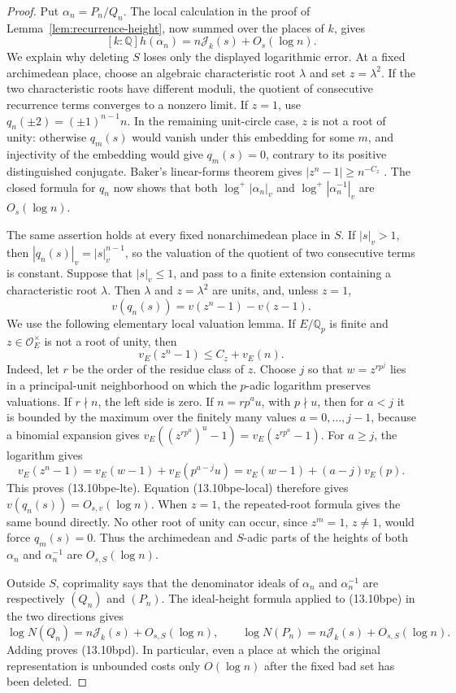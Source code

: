 \documentclass[11pt,reqno]{amsart}
\theoremstyle{definition}
\theoremstyle{remark}
\newcommand{\Q}{\mathbb Q}
\begin{document}
\begin{proof}
Put \(\alpha_n=P_n/Q_n\).  The local calculation in the proof of
Lemma~\ref{lem:recurrence-height}, now summed over the places of \(k\), gives
\[
 [k:\Q]h(\alpha_n)=n\mathcal J_k(s)+O_s(\log n).
\tag{13.10bpe}
\]
We explain why deleting \(S\) loses only the displayed logarithmic error.
At a fixed archimedean place, choose an algebraic characteristic root
\(\lambda\) and set \(z=\lambda^2\).  If the two characteristic roots have
different moduli, the quotient of consecutive recurrence terms converges to
a nonzero limit.  If \(z=1\), use
\(q_n(\mathord\pm2)=(\mathord\pm1)^{n-1}n\).  In the remaining unit-circle
case, \(z\) is not a root of unity: otherwise \(q_m(s)\) would vanish under
this embedding for some \(m\), and injectivity of the embedding would give
\(q_m(s)=0\), contrary to its positive distinguished conjugate.  Baker's
linear-forms theorem gives \(|z^n-1|\ge n^{-C_z}\)
\cite{BakerLinearForms}.  The closed formula for \(q_n\) now shows that both
\(\log^+|\alpha_n|_v\) and
\(\log^+|\alpha_n^{-1}|_v\) are \(O_s(\log n)\).

The same assertion holds at every fixed nonarchimedean place in \(S\).
If \(|s|_v>1\), then
\(|q_n(s)|_v=|s|_v^{n-1}\), so the valuation of the quotient of two
consecutive terms is constant.  Suppose that \(|s|_v\le1\), and pass to a
finite extension containing a characteristic root \(\lambda\).  Then
\(\lambda\) and \(z=\lambda^2\) are units, and, unless \(z=1\),
\[
 v(q_n(s))=v(z^n-1)-v(z-1).
\tag{13.10bpe-local}
\]
We use the following elementary local valuation lemma.  If \(E/\Q_p\) is
finite and \(z\in\mathcal O_E^\times\) is not a root of unity, then
\[
 v_E(z^n-1)\le C_z+v_E(n).
\tag{13.10bpe-lte}
\]
Indeed, let \(r\) be the order of the residue class of \(z\).  Choose \(j\)
so that \(w=z^{rp^j}\) lies in a principal-unit neighborhood on which the
\(p\)-adic logarithm preserves valuations.  If \(r\nmid n\), the left side
is zero.  If \(n=rp^au\), with \(p\nmid u\), then for \(a<j\) it is bounded
by the maximum over the finitely many values \(a=0,\ldots,j-1\), because a
binomial expansion gives
\(v_E((z^{rp^a})^u-1)=v_E(z^{rp^a}-1)\).  For \(a\ge j\), the logarithm gives
\[
 v_E(z^n-1)=v_E(w-1)+v_E(p^{a-j}u)
           =v_E(w-1)+(a-j)v_E(p).
\]
This proves (13.10bpe-lte).  Equation (13.10bpe-local) therefore gives
\(v(q_n(s))=O_{s,v}(\log n)\).  When \(z=1\), the repeated-root formula
gives the same bound directly.  No other root of unity can occur, since
\(z^m=1\), \(z\ne1\), would force \(q_m(s)=0\).
Thus the archimedean and \(S\)-adic parts of the heights of both
\(\alpha_n\) and \(\alpha_n^{-1}\) are \(O_{s,S}(\log n)\).

Outside \(S\), coprimality says that the denominator ideals of
\(\alpha_n\) and \(\alpha_n^{-1}\) are respectively \((Q_n)\) and
\((P_n)\).  The ideal-height formula applied to (13.10bpe) in the two
directions gives
\[
 \log N(Q_n)=n\mathcal J_k(s)+O_{s,S}(\log n),\qquad
 \log N(P_n)=n\mathcal J_k(s)+O_{s,S}(\log n).
\]
Adding proves (13.10bpd).  In particular, even a place at which the original
representation is unbounded costs only \(O(\log n)\) after the fixed bad set
has been deleted.
\end{proof}
\end{document}
